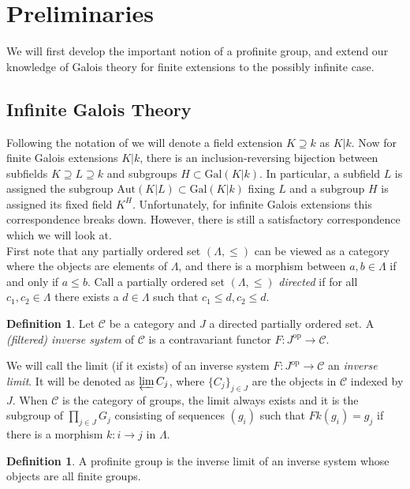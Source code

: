 \documentclass{article}
\theoremstyle{definition}
\newtheorem{definition}[theorem]{Definition}
\theoremstyle{remark}
\newcommand{\mc}[1]{\mathcal{#1}}
\begin{document}
\section{Preliminaries}
We will first develop the important notion of a profinite group, and extend our knowledge of Galois theory for finite extensions to the possibly infinite case.

\subsection{Infinite Galois Theory}

Following the notation of \cite{Szamuely} we will denote a field extension $K \supseteq k$ as $K|k$. 
Now for finite Galois extensions $K|k$, there is an inclusion-reversing bijection between subfields $K \supseteq L \supseteq k$ and subgroups $H \subset \text{Gal}(K|k)$.
In particular, a subfield $L$ is assigned the subgroup $\text{Aut}(K|L) \subset \text{Gal}(K|k)$ fixing $L$ and a subgroup $H$ is assigned its fixed field $K^H$.
Unfortunately, for infinite Galois extensions this correspondence breaks down.
However, there is still a satisfactory correspondence which we will look at.\\

First note that any partially ordered set $(\Lambda, \leq)$ can be viewed as a category where the objects are elements of $\Lambda$, and there is a morphism between $a,b \in \Lambda$ if and only if $a \leq b$.
Call a partially ordered set $(\Lambda, \leq)$ \textit{directed} if for all $c_1, c_2 \in \Lambda$ there exists a $d \in \Lambda$ such that $c_1 \leq d, c_2 \leq d$.

\begin{definition}
	Let $\mc{C}$ be a category and $J$ a directed partially ordered set. A \textit{(filtered) inverse system} of $\mc{C}$ is a contravariant functor $F: J^{\text{op}} \to \mc{C}$.
\end{definition}

We will call the limit (if it exists) of an inverse system $F: J^{\text{op}} \to \mc{C}$ an \textit{inverse limit}.
It will be denoted as $\varprojlim C_{j}$, where $\{C_j\}_{j \in J}$ are the objects in $\mc{C}$ indexed by $J$.
When $\mc{C}$ is the category of groups, the limit always exists and it is the subgroup of $\prod_{j \in J} G_j$ consisting of sequences $(g_i)$ such that $Fk(g_i) = g_j$ if there is a morphism $k: i  \to j$ in $\Lambda$.

\begin{definition}
	A profinite group is the inverse limit of an inverse system whose objects are all finite groups.
\end{definition}
\end{document}

